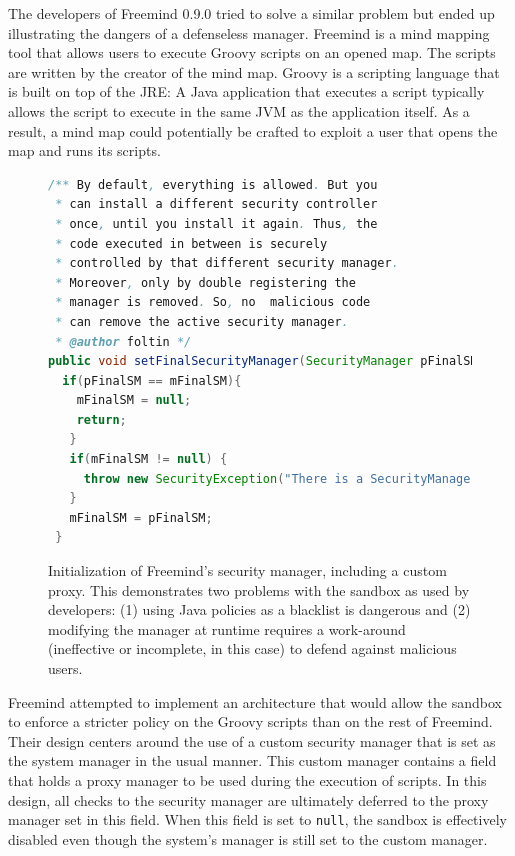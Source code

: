 \documentclass{sig-alternate}
\begin{document}
The developers of Freemind 0.9.0 tried to solve a similar problem but ended up illustrating
the dangers of a defenseless manager. Freemind is a mind mapping tool
that allows users to execute Groovy scripts on an opened map. The
scripts are written by the creator of the mind map. Groovy is a scripting
language that is built on top of the JRE: A Java application that
executes a script typically allows the script to execute in the same
JVM as the application itself. As a result, a mind map could potentially
be crafted to exploit a user that opens the map and runs its scripts.

\begin{figure}
\begin{lstlisting}[language=Java,firstnumber=31]
/** By default, everything is allowed. But you
 * can install a different security controller
 * once, until you install it again. Thus, the
 * code executed in between is securely
 * controlled by that different security manager.  
 * Moreover, only by double registering the
 * manager is removed. So, no  malicious code 
 * can remove the active security manager.  
 * @author foltin */
public void setFinalSecurityManager(SecurityManager pFinalSM) {
  if(pFinalSM == mFinalSM){
    mFinalSM = null;
    return;
   } 		
   if(mFinalSM != null) {
     throw new SecurityException("There is a SecurityManager installed already."); 		
   } 		
   mFinalSM = pFinalSM;
 }	
\end{lstlisting}
\caption{Initialization of Freemind's 
  \label{fig:Freemind-Security-Manager} security manager, including a custom proxy.
  This demonstrates two problems with the sandbox as used by developers: (1) 
  using Java policies as a blacklist is
  dangerous and (2) modifying the manager at runtime requires 
  a work-around (ineffective or incomplete, in this case) to defend against malicious
  users.}
\end{figure}

Freemind attempted to implement an architecture that would allow the
sandbox to enforce a stricter policy on the Groovy scripts than on
the rest of Freemind. Their design centers around the use of a custom
security manager that is set as the system manager in the usual manner.
This custom manager contains a field that holds a proxy manager to be used during the execution of
scripts. In this design, all checks to the security manager are ultimately
deferred to the proxy manager set in this field. When
this field is set to \texttt{null}, the sandbox is effectively disabled
even though the system's manager is still set to the custom manager.
\end{document}
